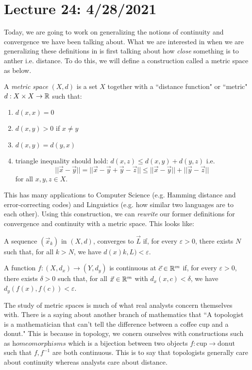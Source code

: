 \section{Lecture 24: 4/28/2021}
Today, we are going to work on generalizing the notions of continuity and convergence we have been talking about. What we are interested in when we are generalizing these definitions in is first talking about how \textit{close} something is to anther i.e. distance. To do this, we will define a construction called a metric space as below.

\begin{definition}
A \textit{metric space} $(X,d)$ is a set $X$ together with a ``distance function" or ``metric" $d: X \times X \to \mathbb{R}$ such that:
\begin{enumerate}
    \item $d(x, x) = 0$
    \item $d(x,y) > 0$ if $x \neq y$
    \item $d(x,y) = d(y,x)$
    \item triangle inequality should hold: $d(x,z) \leq d(x,y) + d(y,z)$ i.e. 
    $$
    ||\vec{x} - \vec{y}|| = ||\vec{x}-\vec{y}+\vec{y}-\vec{z}|| \leq ||\vec{x}-\vec{y}|| + ||\vec{y}-\vec{z}||
    $$
    for all $x,y,z \in X$.
\end{enumerate}
\end{definition}

This has many applications to Computer Science (e.g. Hamming distance and error-correcting codes) and Linguistics (e.g. how similar two languages are to each other). Using this construction, we can \textit{rewrite} our former definitions for convergence and continuity with a metric space. This looks like:
\begin{definition}[Convergence]
A sequence $(\vec{x}_k)$ in $(X, d)$, converges to $\vec{L}$ if, for every $\varepsilon > 0$, there exists $N$ such that, for all $k>N$, we have $d(x)k, L) < \varepsilon$.
\end{definition}

\begin{definition}
A function $f:(X, d_x) \to (Y, d_y)$ is continuous at $\vec{c}\in \mathbb{R}^m$ if, for every $\varepsilon > 0$, there exists $\delta > 0$ such that, for all $\vec{x}\in \mathbb{R}^m$ with $d_x(x,c)<\delta$, we have $d_y(f(x), f(c)) < \varepsilon$.
\end{definition}

The study of metric spaces is much of what real analysts concern themselves with. There is a saying about another branch of mathematics that ``A topologist is a mathematician that can't tell the difference between a coffee cup and a donut." This is because in topology, we conern ourselves with constructions such as $\textit{homeomorphisms}$ which is a bijection between two objects $f: \text{cup} \to \text{donut}$ such that $f, f^{-1}$ are both continuous. This is to say that topologists generally care about continuity whereas analysts care about distance. 

